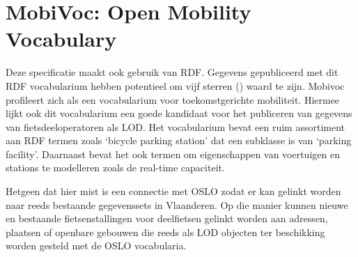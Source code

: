 \section{MobiVoc: Open Mobility Vocabulary}
\label{sec:mobivoc}
Deze specificatie maakt ook gebruik van RDF. Gegevens gepubliceerd met dit RDF vocabularium hebben potentieel om vijf sterren (\ast \ast \ast \ast \ast) waard te zijn. Mobivoc profileert zich als een vocabularium voor toekomstgerichte mobiliteit. Hiermee lijkt ook dit vocabularium een goede kandidaat voor het publiceren van gegevens van fietsdeeloperatoren als LOD. Het vocabularium bevat een ruim assortiment aan RDF termen zoals `bicycle parking station' dat een subklasse is van `parking facility'. Daarnaast bevat het ook termen om eigenschappen van voertuigen en stations te modelleren zoals de real-time capaciteit. 

Hetgeen dat hier mist is een connectie met OSLO zodat er kan gelinkt worden naar reeds bestaande gegevenssets in Vlaanderen. Op die manier kunnen nieuwe en bestaande fietsenstallingen voor deelfietsen gelinkt worden aan adressen, plaatsen of openbare gebouwen die reeds als LOD objecten ter beschikking worden gesteld met de OSLO vocabularia. 